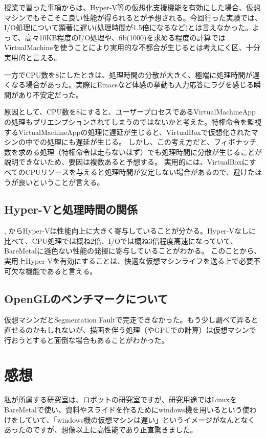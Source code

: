 \documentclass[onecolumn]{preport}
\begin{document}
授業で習った事項からは、Hyper-V等の仮想化支援機能を有効にした場合、仮想マシンでもそこそこ良い性能が得られるとが予想される。今回行った実験では、I/O処理について顕著に遅い(処理時間が1.5倍になるなど)とは言えなかった。よって、高々10KB程度のI/O処理や、fib(1000)を求める程度の計算ではVirtualMachineを使うことにより実用的な不都合が生じるとは考えにく区、十分実用的と言える。

一方でCPU数を8にしたときは、処理時間の分散が大きく、極端に処理時間が遅くなる場合があった。実際にEmacsなど体感の挙動も入力応答にラグを感じる瞬間があり不安定だった。

原因として、CPU数を8にすると、ユーザープロセスであるVirtualMachineAppの処理もプリエンプションされてしまうのではないかと考えた。特権命令を監視するVirtualMachineAppの処理に遅延が生じると、VirtualBoxで仮想化されたマシンの中での処理にも遅延が生じる。
しかし、この考え方だと、フィボナッチ数を求める処理（特権命令は走らないはず）でも処理時間に分散が生じることが説明できないため、要因は複数あると予想する。
実用的には、VirtualBoxにすべてのCPUリソースを与えると処理時間が安定しない場合があるので、避けたほうが良いということが言える。

\subsection{Hyper-Vと処理時間の関係}
, からHyper-Vは性能向上に大きく寄与していることが分かる。Hyper-Vなしに比べて、CPU処理では概ね2倍、I/Oでは概ね3倍程度高速になっていて、BareMetalに遜色ない性能の発揮に寄与していることがわかる。
このことから、実用上Hyper-Vを有効にすることは、快適な仮想マシンライフを送る上で必要不可欠な機能であると言える。

\subsection{OpenGLのベンチマークについて}
仮想マシンだとSegmentation Faultで完走できなかった。もう少し調べて弄ると直せるのかもしれないが、描画を伴う処理（やGPUでの計算）は仮想マシンで行おうとすると面倒な場合もあることがわかった。


\section{感想}
私が所属する研究室は、ロボットの研究室ですが、研究用途ではLinuxをBareMetalで使い、資料やスライドを作るためにwindows機を用いるという使わけをしていて、「windows機の仮想マシンは遅い」というイメージがなんとなくあったのですが、想像以上に高性能であり正直驚きました。



\end{document}
